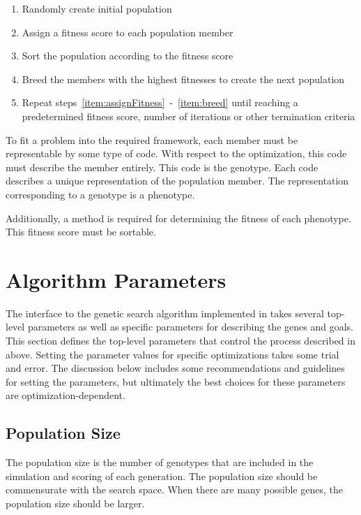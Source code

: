 \begin{enumerate}
  \item Randomly create initial population
  \item Assign a fitness score to each population member \label{item:assignFitness}
  \item Sort the population according to the fitness score
  \item Breed the members with the highest fitnesses to create the next population \label{item:breed}
  \item Repeat steps~\ref{item:assignFitness}~-~\ref{item:breed} until reaching a predetermined fitness score, number of iterations or other termination criteria
\end{enumerate}

To fit a problem into the required framework, each member must be representable by some type of code. With respect to the optimization, this code must describe the member entirely.  This code is the genotype.  Each code describes a unique representation of the population member.  The representation corresponding to a genotype is a phenotype.

Additionally, a method is required for determining the fitness of each phenotype.  This fitness score must be sortable.

\section{Algorithm Parameters} \label{sec:algorithmParameters}

The interface to the genetic search algorithm implemented in \vvase{} takes several top-level parameters as well as specific parameters for describing the genes and goals.  This section defines the top-level parameters that control the process described in  above.  Setting the parameter values for specific optimizations takes some trial and error.  The discussion below includes some recommendations and guidelines for setting the parameters, but ultimately the best choices for these parameters are optimization-dependent.

\subsection{Population Size} \label{ssec:populationSize}

The population size is the number of genotypes that are included in the simulation and scoring of each generation.  The population size should be commensurate with the search space.  When there are many possible genes, the population size should be larger.

